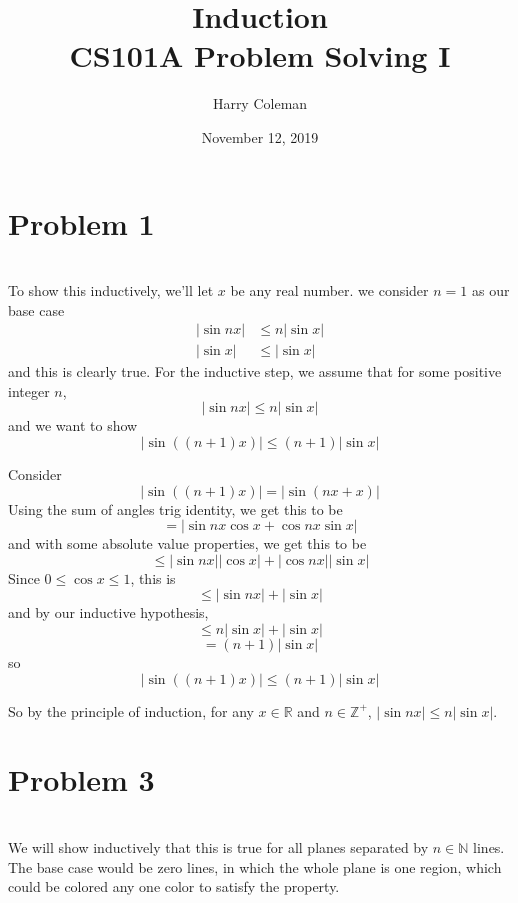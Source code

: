 \documentclass[12pt]{article}
\newcommand{\N}{\mathbb{N}}
\newcommand{\Z}{\mathbb{Z}}
\newcommand{\R}{\mathbb{R}}
\begin{document}
 
\title{Induction\\
    \large CS101A Problem Solving I}
\author{Harry Coleman}
\date{November 12, 2019}

\maketitle

\section*{Problem 1}
\\

To show this inductively, we'll let $x$ be any real number. we consider $n=1$ as our base case
\begin{align*}
    |\sin{nx}| &\leq n|\sin{x}| \\
    |\sin{x}| &\leq |\sin{x}|
\end{align*}
and this is clearly true. For the inductive step, we assume that for some positive integer $n$,
\[|\sin{nx}| \leq n|\sin{x}|\]
and we want to show
\[|\sin{((n+1)x)}| \leq (n+1)|\sin{x}|\]

Consider
\[|\sin{((n+1)x)}| = |\sin{(nx + x)}|\]
Using the sum of angles trig identity, we get this to be
\[=|\sin{nx}\cos{x} + \cos{nx}\sin{x}|\]
and with some absolute value properties, we get this to be
\[\leq|\sin{nx}||\cos{x}| + |\cos{nx}||\sin{x}|\]
Since $0\leq \cos{x}\leq 1$, this is
\[\leq|\sin{nx}| + |\sin{x}|\]
and by our inductive hypothesis,
\[\leq n|\sin{x}|+|\sin{x}|\]
\[=(n+1)|\sin{x}|\]
so
\[|\sin{((n+1)x)}| \leq (n+1)|\sin{x}|\]

So by the principle of induction, for any $x\in\R$ and $n\in\Z^+$, $|\sin{nx}| \leq n|\sin{x}|$.

\newpage
\section*{Problem 3}
\\

We will show inductively that this is true for all planes separated by $n\in\N$ lines. The base case would be zero lines, in which the whole plane is one region, which could be colored any one color to satisfy the property.
\end{document}
